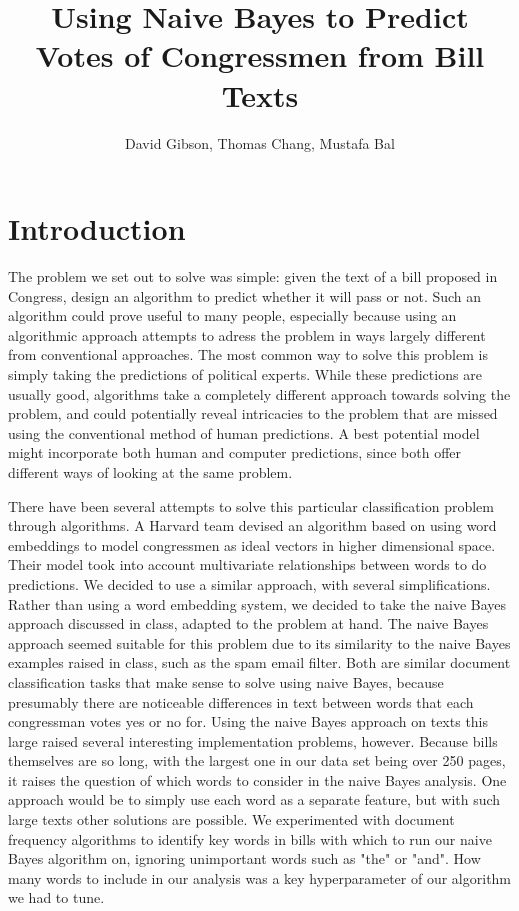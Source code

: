 \documentclass[11pt]{article}
\title{Using Naive Bayes to Predict Votes of Congressmen from Bill Texts}
\author{David Gibson, Thomas Chang, Mustafa Bal}
\begin{document}
\maketitle{}


\section{Introduction}

The problem we set out to solve was simple: given the text of a bill proposed in Congress, design an algorithm to predict whether it will pass or not. Such an algorithm could prove useful to many people, especially because using an algorithmic approach attempts to adress the problem in ways largely different from conventional approaches. The most common way to solve this problem is simply taking the predictions of political experts. While these predictions are usually good, algorithms take a completely different approach towards solving the problem, and could potentially reveal intricacies to the problem that are missed using the conventional method of human predictions. A best potential model might incorporate both human and computer predictions, since both offer different ways of looking at the same problem.

There have been several attempts to solve this particular classification problem through algorithms. A Harvard team devised an algorithm based on using word embeddings to model congressmen as ideal vectors in higher dimensional space. Their model took into account multivariate relationships between words to do predictions. We decided to use a similar approach, with several simplifications. Rather than using a word embedding system, we decided to take the naive Bayes approach discussed in class, adapted to the problem at hand. The naive Bayes approach seemed suitable for this problem due to its similarity to the naive Bayes examples raised in class, such as the spam email filter. Both are similar document classification tasks that make sense to solve using naive Bayes, because presumably there are noticeable differences in text between words that each congressman votes yes or no for. Using the naive Bayes approach on texts this large raised several interesting implementation problems, however. Because bills themselves are so long, with the largest one in our data set being over 250 pages, it raises the question of which words to consider in the naive Bayes analysis. One approach would be to simply use each word as a separate feature, but with such large texts other solutions are possible. We experimented with document frequency algorithms to identify key words in bills with which to run our naive Bayes algorithm on, ignoring unimportant words such as "the" or "and". How many words to include in our analysis was a key hyperparameter of our algorithm we had to tune.
\end{document}
